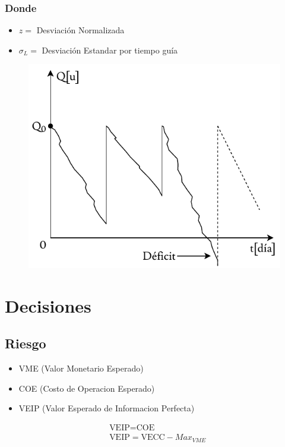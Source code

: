 \documentclass[10pt,letterpaper]{article}
\begin{document}
\subsubsection*{Donde}
\begin{itemize}
\item $z=$ Desviación Normalizada
\item $\sigma_L=$ Desviación Estandar por tiempo guía
\end{itemize}
\begin{figure}[H]
\centering
\includegraphics[scale=0.8]{PROB.pdf}
\end{figure}
\section{Decisiones}
\subsection{Riesgo}
\begin{minipage}[t]{.5\textwidth}
\raggedright
\begin{itemize}
\item VME (Valor Monetario Esperado)
\item COE (Costo de Operacion Esperado)
\item VEIP (Valor Esperado de Informacion Perfecta)
\end{itemize}
\end{minipage}%
\begin{minipage}[t]{.5\textwidth}
\raggedright
\vspace{-0.8cm}
\begin{align*}
& \text{VEIP} = \text{COE} \\
& \text{VEIP} = \text{VECC} - Max_{VME}
\end{align*}
\end{minipage}%
\end{document}
